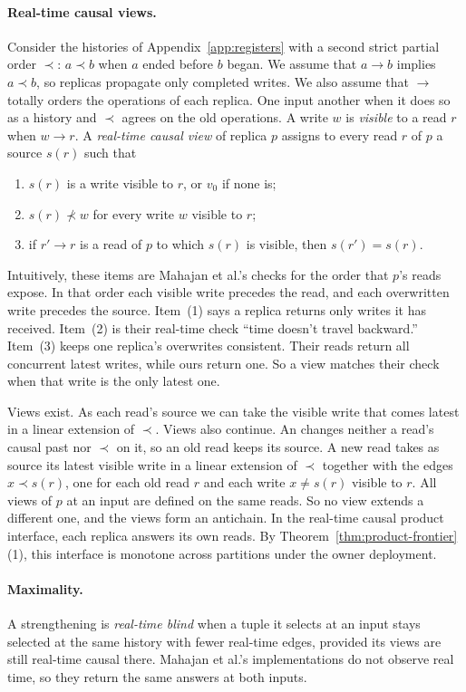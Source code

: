 \paragraph{Real-time causal views.}
Consider the histories of Appendix~\ref{app:registers} with a second strict
partial order $\prec$: $a\prec b$ when $a$ ended before $b$ began.  We assume
that $a\to b$ implies $a\prec b$, so replicas propagate only completed writes.
We also assume that $\to$ totally orders the operations of each replica.  One
input \inrel another when it does so as a history and $\prec$ agrees on the
old operations.  A write $w$ is \emph{visible} to a read $r$ when $w\to r$.  A
\emph{real-time causal view} of replica $p$ assigns to every read $r$ of $p$ a
source $s(r)$ such that
\begin{enumerate}
  \item $s(r)$ is a write visible to $r$, or $v_0$ if none is;
  \item $s(r)\not\prec w$ for every write $w$ visible to $r$;
  \item if $r'\to r$ is a read of $p$ to which $s(r)$ is visible, then
        $s(r')=s(r)$.
\end{enumerate}
Intuitively, these items are Mahajan et al.'s checks for the order that $p$'s
reads expose.  In that order each visible write precedes the read, and each
overwritten write precedes the source.  Item~(1) says a replica returns only
writes it has received.  Item~(2) is their real-time check ``time doesn't
travel backward.''  Item~(3) keeps one replica's overwrites consistent.  Their
reads return all concurrent latest writes, while ours return one.  So a view
matches their check when that write is the only latest one.

Views exist.  As each read's source we can take the visible write that comes
latest in a linear extension of $\prec$.  Views also continue.  An \indesc
changes neither a read's causal past nor $\prec$ on it, so an old read keeps
its source.  A new read takes as source its latest visible write in a linear
extension of $\prec$ together with the edges $x\prec s(r)$, one for each old
read $r$ and each write $x\ne s(r)$ visible to $r$.  All views of $p$ at an
input are defined on the same reads.  So no view extends a different one, and
the views form an antichain.  In the real-time causal product interface, each
replica answers its own reads.  By Theorem~\ref{thm:product-frontier}(1), this
interface is monotone across partitions under the owner deployment.

\paragraph{Maximality.}
A strengthening is \emph{real-time blind} when a tuple it selects at an input
stays selected at the same history with fewer real-time edges, provided its
views are still real-time causal there.  Mahajan et al.'s implementations do
not observe real time, so they return the same answers at both inputs.

